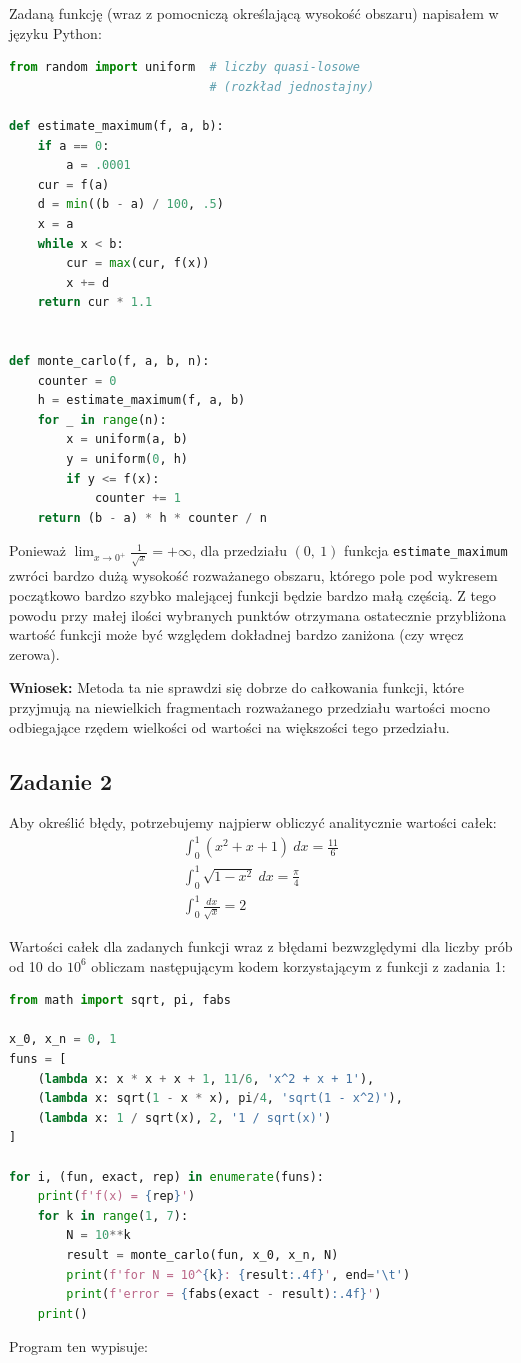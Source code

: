 \documentclass{article}
\begin{document}
\noindent
Zadaną funkcję (wraz z pomocniczą określającą wysokość obszaru) napisałem w języku Python:
\begin{lstlisting}[language=Python]
from random import uniform  # liczby quasi-losowe
                            # (rozkład jednostajny)

def estimate_maximum(f, a, b):
    if a == 0:
        a = .0001
    cur = f(a)
    d = min((b - a) / 100, .5)
    x = a
    while x < b:
        cur = max(cur, f(x))
        x += d
    return cur * 1.1


def monte_carlo(f, a, b, n):
    counter = 0
    h = estimate_maximum(f, a, b)
    for _ in range(n):
        x = uniform(a, b)
        y = uniform(0, h)
        if y <= f(x):
            counter += 1
    return (b - a) * h * counter / n
\end{lstlisting}
Ponieważ \(\lim_{x \to 0^+} \frac{1}{\sqrt{x}} = +\infty\), dla przedziału \((0,\ 1)\) funkcja \verb|estimate_maximum| zwróci bardzo dużą wysokość rozważanego obszaru, którego pole pod wykresem początkowo bardzo szybko malejącej funkcji będzie bardzo małą częścią. Z tego powodu przy małej ilości wybranych punktów otrzymana ostatecznie przybliżona wartość funkcji może być względem dokładnej bardzo zaniżona (czy wręcz zerowa).

\vspace{5mm}
\noindent
\textbf{Wniosek:} Metoda ta nie sprawdzi się dobrze do całkowania funkcji, które przyjmują na niewielkich fragmentach rozważanego przedziału wartości mocno odbiegające rzędem wielkości od wartości na większości tego przedziału.

\newpage

\subsection{Zadanie 2}

Aby określić błędy, potrzebujemy najpierw obliczyć analitycznie wartości całek:
\begin{gather*}
    \int_0^1 (x^2 + x + 1)\ dx = \frac{11}{6}\\
    \int_0^1 \sqrt{1 - x^2}\ dx = \frac{\pi}{4}\\
    \int_0^1 \frac{dx}{\sqrt{x}} = 2
\end{gather*}

\noindent
Wartości całek dla zadanych funkcji wraz z błędami bezwzględymi dla liczby prób od 10 do \(10^6\) obliczam następującym kodem korzystającym z funkcji z zadania 1:
\begin{lstlisting}[language=Python]
from math import sqrt, pi, fabs

x_0, x_n = 0, 1
funs = [
    (lambda x: x * x + x + 1, 11/6, 'x^2 + x + 1'),
    (lambda x: sqrt(1 - x * x), pi/4, 'sqrt(1 - x^2)'),
    (lambda x: 1 / sqrt(x), 2, '1 / sqrt(x)')
]

for i, (fun, exact, rep) in enumerate(funs):
    print(f'f(x) = {rep}')
    for k in range(1, 7):
        N = 10**k
        result = monte_carlo(fun, x_0, x_n, N)
        print(f'for N = 10^{k}: {result:.4f}', end='\t')
        print(f'error = {fabs(exact - result):.4f}')
    print()
\end{lstlisting}
Program ten wypisuje:
\end{document}
